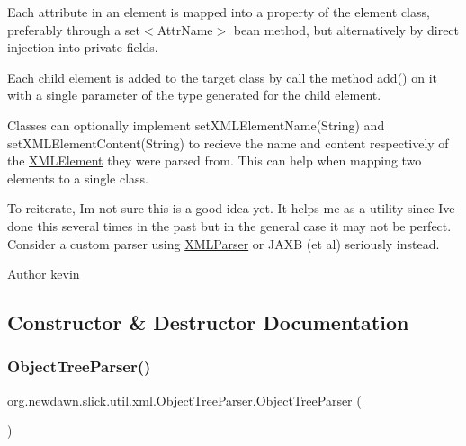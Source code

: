 Each attribute in an element is mapped into a property of the element class, preferably through a set$<$\+Attr\+Name$>$ bean method, but alternatively by direct injection into private fields.

Each child element is added to the target class by call the method add() on it with a single parameter of the type generated for the child element.

Classes can optionally implement set\+X\+M\+L\+Element\+Name(\+String) and set\+X\+M\+L\+Element\+Content(\+String) to recieve the name and content respectively of the \mbox{\hyperlink{classorg_1_1newdawn_1_1slick_1_1util_1_1xml_1_1_x_m_l_element}{X\+M\+L\+Element}} they were parsed from. This can help when mapping two elements to a single class.

To reiterate, I\textquotesingle{}m not sure this is a good idea yet. It helps me as a utility since I\textquotesingle{}ve done this several times in the past but in the general case it may not be perfect. Consider a custom parser using \mbox{\hyperlink{classorg_1_1newdawn_1_1slick_1_1util_1_1xml_1_1_x_m_l_parser}{X\+M\+L\+Parser}} or J\+A\+XB (et al) seriously instead.

\begin{DoxyAuthor}{Author}
kevin 
\end{DoxyAuthor}


\subsection{Constructor \& Destructor Documentation}
\mbox{\label{classorg_1_1newdawn_1_1slick_1_1util_1_1xml_1_1_object_tree_parser_af4c8c1f09a9c56dce175cb70e9a57926}} 
\subsubsection{\texorpdfstring{Object\+Tree\+Parser()}{ObjectTreeParser()}\hspace{0.1cm}{\footnotesize\ttfamily [1/2]}}
{\footnotesize\ttfamily org.\+newdawn.\+slick.\+util.\+xml.\+Object\+Tree\+Parser.\+Object\+Tree\+Parser (\begin{DoxyParamCaption}{ }\end{DoxyParamCaption})\hspace{0.3cm}{\ttfamily [inline]}}

